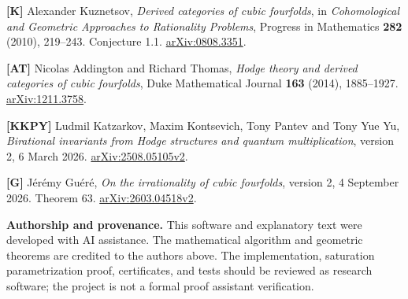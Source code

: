 \documentclass[
  american,
  11pt,
  a4paper,
]{article}
\begin{document}
\textbf{{[}K{]}} Alexander Kuznetsov, \emph{Derived categories of cubic
fourfolds}, in \emph{Cohomological and Geometric Approaches to
Rationality Problems}, Progress in Mathematics \textbf{282} (2010),
219--243. Conjecture 1.1.
\href{https://arxiv.org/abs/0808.3351}{arXiv:0808.3351}.

\textbf{{[}AT{]}} Nicolas Addington and Richard Thomas, \emph{Hodge
theory and derived categories of cubic fourfolds}, Duke Mathematical
Journal \textbf{163} (2014), 1885--1927.
\href{https://arxiv.org/abs/1211.3758}{arXiv:1211.3758}.

\textbf{{[}KKPY{]}} Ludmil Katzarkov, Maxim Kontsevich, Tony Pantev and
Tony Yue Yu, \emph{Birational invariants from Hodge structures and
quantum multiplication}, version 2, 6 March 2026.
\href{https://arxiv.org/abs/2508.05105v2}{arXiv:2508.05105v2}.

\textbf{{[}G{]}} Jérémy Guéré, \emph{On the irrationality of cubic
fourfolds}, version 2, 4 September 2026. Theorem 63.
\href{https://arxiv.org/abs/2603.04518v2}{arXiv:2603.04518v2}.

\textbf{Authorship and provenance.} This software and explanatory text
were developed with AI assistance. The mathematical algorithm and
geometric theorems are credited to the authors above. The
implementation, saturation parametrization proof, certificates, and
tests should be reviewed as research software; the project is not a
formal proof assistant verification.
\end{document}
